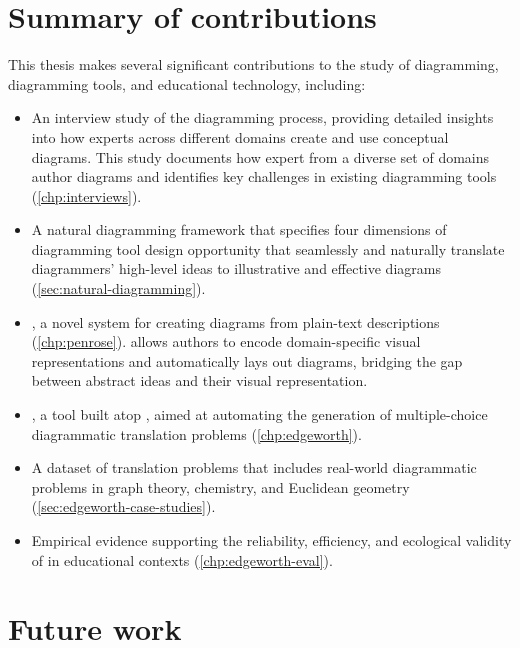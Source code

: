 \section{Summary of contributions}

This thesis makes several significant contributions to the study of diagramming, diagramming tools, and educational technology, including:

\begin{itemize}

    \item An interview study of the diagramming process, providing detailed insights into how experts across different domains create and use conceptual diagrams. This study documents how expert from a diverse set of domains author diagrams and identifies key challenges in existing diagramming tools (\cref{chp:interviews}).

    \item A natural diagramming framework that specifies four dimensions of diagramming tool design opportunity that seamlessly and naturally translate diagrammers’ high-level ideas to illustrative and effective diagrams (\cref{sec:natural-diagramming}).
    
    \item \Penrose, a novel system for creating diagrams from plain-text descriptions (\cref{chp:penrose}). \Penrose allows authors to encode domain-specific visual representations and automatically lays out diagrams, bridging the gap between abstract ideas and their visual representation.
    
    \item \Edgeworth, a tool built atop \Penrose, aimed at automating the generation of multiple-choice diagrammatic translation problems (\cref{chp:edgeworth}). 
    
    \item A dataset of translation problems that includes real-world diagrammatic problems in graph theory, chemistry, and Euclidean geometry (\cref{sec:edgeworth-case-studies}).
    
    \item Empirical evidence supporting the reliability, efficiency, and ecological validity of \Edgeworth in educational contexts (\cref{chp:edgeworth-eval}). 
    
\end{itemize}


\section{Future work}


